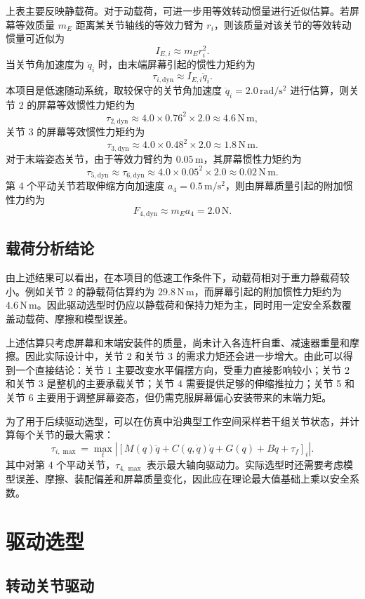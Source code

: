 \documentclass[12pt,a4paper,UTF8]{article}
\begin{document}
上表主要反映静载荷。对于动载荷，可进一步用等效转动惯量进行近似估算。若屏幕等效质量 $m_E$ 距离某关节轴线的等效力臂为 $r_i$，则该质量对该关节的等效转动惯量可近似为
\[
I_{E,i}\approx m_E r_i^2 .
\]
当关节角加速度为 $\ddot q_i$ 时，由末端屏幕引起的惯性力矩约为
\[
\tau_{i,\mathrm{dyn}}\approx I_{E,i}\ddot q_i .
\]
本项目是低速随动系统，取较保守的关节角加速度 $\ddot q_i=2.0\,\mathrm{rad/s^2}$ 进行估算，则关节 2 的屏幕等效惯性力矩约为
\[
\tau_{2,\mathrm{dyn}}
\approx 4.0\times 0.76^2\times 2.0
\approx 4.6\,\mathrm{N\,m},
\]
关节 3 的屏幕等效惯性力矩约为
\[
\tau_{3,\mathrm{dyn}}
\approx 4.0\times 0.48^2\times 2.0
\approx 1.8\,\mathrm{N\,m}.
\]
对于末端姿态关节，由于等效力臂约为 $0.05\,\mathrm{m}$，其屏幕惯性力矩约为
\[
\tau_{5,\mathrm{dyn}}\approx\tau_{6,\mathrm{dyn}}
\approx 4.0\times 0.05^2\times 2.0
\approx 0.02\,\mathrm{N\,m}.
\]
第 4 个平动关节若取伸缩方向加速度 $a_4=0.5\,\mathrm{m/s^2}$，则由屏幕质量引起的附加惯性力约为
\[
F_{4,\mathrm{dyn}}\approx m_E a_4=2.0\,\mathrm{N}.
\]

\subsection{载荷分析结论}

由上述结果可以看出，在本项目的低速工作条件下，动载荷相对于重力静载荷较小。例如关节 2 的静载荷估算约为 $29.8\,\mathrm{N\,m}$，而屏幕引起的附加惯性力矩约为 $4.6\,\mathrm{N\,m}$。因此驱动选型时仍应以静载荷和保持力矩为主，同时用一定安全系数覆盖动载荷、摩擦和模型误差。

上述估算只考虑屏幕和末端安装件的质量，尚未计入各连杆自重、减速器重量和摩擦。因此实际设计中，关节 2 和关节 3 的需求力矩还会进一步增大。由此可以得到一个直接结论：关节 1 主要改变水平偏摆方向，受重力直接影响较小；关节 2 和关节 3 是整机的主要承载关节；关节 4 需要提供足够的伸缩推拉力；关节 5 和关节 6 主要用于调整屏幕姿态，但仍需克服屏幕偏心安装带来的末端力矩。

为了用于后续驱动选型，可以在仿真中沿典型工作空间采样若干组关节状态，并计算每个关节的最大需求：
\[
\tau_{i,\max}=
\max_t
\left|
\left[
M(q)\ddot q+C(q,\dot q)\dot q+G(q)+B\dot q+\tau_f
\right]_i
\right| .
\]
其中对第 4 个平动关节，$\tau_{4,\max}$ 表示最大轴向驱动力。实际选型时还需要考虑模型误差、摩擦、装配偏差和屏幕质量变化，因此应在理论最大值基础上乘以安全系数。

\clearpage
\section{驱动选型}

\subsection{转动关节驱动}
\end{document}

